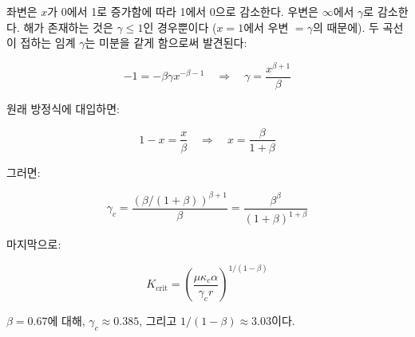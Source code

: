 \documentclass[12pt,a4paper]{article}
\newcommand{\kappac}{\kappa_c}
\theoremstyle{remark}
\begin{document}
	좌변은 \(x\)가 0에서 1로 증가함에 따라 1에서 0으로 감소한다. 우변은 \(\infty\)에서 \(\gamma\)로 감소한다. 해가 존재하는 것은 \(\gamma \leq 1\)인 경우뿐이다 (\(x=1\)에서 우변 \(=\gamma\)의 때문에). 두 곡선이 접하는 임계 \(\gamma\)는 미분을 같게 함으로써 발견된다:
	
	\begin{equation}
		-1 = -\beta \gamma x^{-\beta-1} \quad \Rightarrow \quad \gamma = \frac{x^{\beta+1}}{\beta}
		\label{eq:derivative}
	\end{equation}
	
	원래 방정식에 대입하면:
	
	\begin{equation}
		1 - x = \frac{x}{\beta} \quad \Rightarrow \quad x = \frac{\beta}{1+\beta}
		\label{eq:x-crit}
	\end{equation}
	
	그러면:
	
	\begin{equation}
		\gamma_c = \frac{(\beta/(1+\beta))^{\beta+1}}{\beta} = \frac{\beta^{\beta}}{(1+\beta)^{1+\beta}}
		\label{eq:gamma-c-app}
	\end{equation}
	
	마지막으로:
	
	\begin{equation}
		K_{\text{crit}} = \left( \frac{\mu \kappac \alpha}{\gamma_c r} \right)^{1/(1-\beta)}
		\label{eq:Kcrit-app}
	\end{equation}
	
	\(\beta = 0.67\)에 대해, \(\gamma_c \approx 0.385\), 그리고 \(1/(1-\beta) \approx 3.03\)이다.
	
\end{document}
